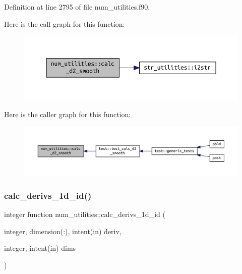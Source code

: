 Definition at line 2795 of file num\+\_\+utilities.\+f90.

Here is the call graph for this function\+:
\nopagebreak
\begin{figure}[H]
\begin{center}
\leavevmode
\includegraphics[width=350pt]{namespacenum__utilities_ab4c91a6478c4dd6f519f8ccbccc4094f_cgraph}
\end{center}
\end{figure}
Here is the caller graph for this function\+:
\nopagebreak
\begin{figure}[H]
\begin{center}
\leavevmode
\includegraphics[width=350pt]{namespacenum__utilities_ab4c91a6478c4dd6f519f8ccbccc4094f_icgraph}
\end{center}
\end{figure}
\mbox{\label{namespacenum__utilities_af2e9ffd7ce2f9391bf8b6f1c344fabca}} 
\subsubsection{\texorpdfstring{calc\+\_\+derivs\+\_\+1d\+\_\+id()}{calc\_derivs\_1d\_id()}}
{\footnotesize\ttfamily integer function num\+\_\+utilities\+::calc\+\_\+derivs\+\_\+1d\+\_\+id (\begin{DoxyParamCaption}\item[{integer, dimension(\+:), intent(in)}]{deriv,  }\item[{integer, intent(in)}]{dims }\end{DoxyParamCaption})}



